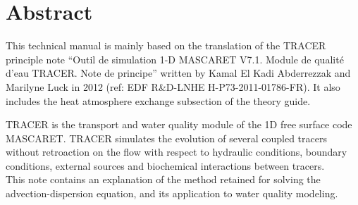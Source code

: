 \documentclass[Waqtel]{../../data/TelemacDoc} %
\begin{document}
\let\cleardoublepage\clearpage
\title{\waqtel}
\subtitle{Technical manual}
\version{\telmaversion}
\date{\today}
\maketitle
\clearpage




\pagestyle{empty} %

\tableofcontents%


\pagestyle{fancy} %

\thispagestyle{empty}

\chapter*{Abstract}
This technical manual is mainly based on the translation of the TRACER principle note
``Outil de simulation 1-D MASCARET V7.1. Module de qualité d'eau TRACER. Note de principe''
written by Kamal El Kadi Abderrezzak and Marilyne Luck in 2012
\cite{elkadi_tracer_2012} (ref: EDF R\&D-LNHE H-P73-2011-01786-FR).
It also includes the heat atmosphere exchange subsection of the  theory guide.

TRACER is the transport and water quality module of the 1D free surface code MASCARET.
TRACER simulates the evolution of several coupled tracers
without retroaction on the flow with respect to hydraulic conditions,
boundary conditions, external sources and biochemical interactions between tracers.\\

This note contains an explanation of the method retained for solving the advection-dispersion equation,
and its application to water quality modeling.
\end{document}
